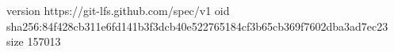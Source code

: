 version https://git-lfs.github.com/spec/v1
oid sha256:84f428cb311e6fd141b3f3dcb40e522765184cf3b65cb369f7602dba3ad7ec23
size 157013

